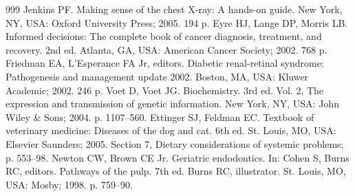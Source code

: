 \documentclass[journal,article,submit,moreauthors,pdftex]{Definitions/tsp}
\begin{document}
\begin{thebibliography}{999}
Jenkins PF. Making sense of the chest X-ray: A hands-on guide. New York, NY, USA: Oxford University Press; 2005. 194 p.
Eyre HJ, Lange DP, Morris LB. Informed decisions: The complete book of cancer diagnosis, treatment, and recovery. 2nd ed. Atlanta, GA, USA: American Cancer Society; 2002. 768 p.
Friedman EA, L’Esperance FA Jr, editors. Diabetic renal-retinal syndrome: Pathogenesis and management update 2002. Boston, MA, USA: Kluwer Academic; 2002. 246 p.
Voet D, Voet JG. Biochemistry. 3rd ed. Vol. 2, The expression and transmission of genetic information. New York, NY, USA: John Wiley \& Sons; 2004. p. 1107--560.
Ettinger SJ, Feldman EC. Textbook of veterinary medicine: Diseases of the dog and cat. 6th ed. St. Louis, MO, USA: Elsevier Saunders; 2005. Section 7, Dietary considerations of systemic problems; p. 553--98.
Newton CW, Brown CE Jr. Geriatric endodontics. In: Cohen S, Burns RC, editors. Pathways of the pulp. 7th ed. Burns RC, illustrator. St. Louis, MO, USA: Mosby; 1998. p. 759--90.


\end{thebibliography}
\end{document}
